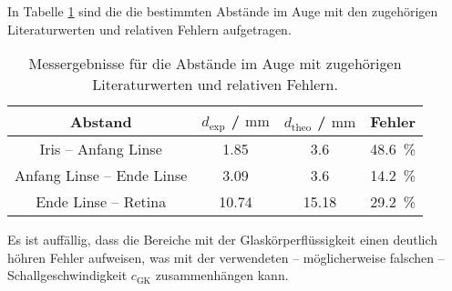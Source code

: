 In Tabelle \ref{tab:augentheorie} sind die die bestimmten Abstände im Auge mit den zugehörigen
Literaturwerten und relativen Fehlern aufgetragen.
\begin{table}
	\centering
	\caption{Messergebnisse für die Abstände im Auge mit zugehörigen Literaturwerten \cite{auge} und relativen Fehlern.}
	\label{tab:augentheorie}
	\begin{tabular}{cccc}
	\toprule
		Abstand & $d_{\mathrm{exp}}$ / $\si{\milli\meter}$ & $d_{\mathrm{theo}}$ / $\si{\milli\meter}$ & Fehler \\
	\midrule
		Iris -- Anfang Linse & \num{1,85} & \num{3,6}& \SI{48,6}{\percent} \\
		Anfang Linse -- Ende Linse & \num{3,09} & \num{3,6}& \SI{14,2}{\percent} \\
		Ende Linse -- Retina & \num{10,74} & \num{15,18} & \SI{29,2}{\percent} \\
	\bottomrule
	\end{tabular}
\end{table}
Es ist auffällig, dass die Bereiche mit der Glaskörperflüssigkeit einen deutlich höhren
Fehler aufweisen, was mit der verwendeten -- möglicherweise falschen --
Schallgeschwindigkeit $c_{\mathrm{GK}}$
zusammenhängen kann.
\FloatBarrier
\newpage
